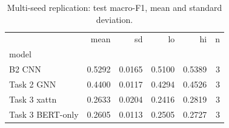 \begin{table}[t]
\caption{Multi-seed replication: test macro-F1, mean and standard deviation.}
\label{tab:seeds}
\begin{tabular}{lrrrrr}
\toprule
 & mean & sd & lo & hi & n \\
model &  &  &  &  &  \\
\midrule
B2 CNN & 0.5292 & 0.0165 & 0.5100 & 0.5389 & 3 \\
Task 2 GNN & 0.4400 & 0.0117 & 0.4294 & 0.4526 & 3 \\
Task 3 xattn & 0.2633 & 0.0204 & 0.2416 & 0.2819 & 3 \\
Task 3 BERT-only & 0.2605 & 0.0113 & 0.2505 & 0.2727 & 3 \\
\bottomrule
\end{tabular}
\end{table}
